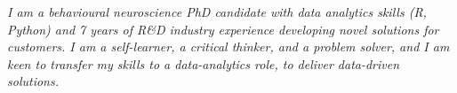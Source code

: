 
\textit{I am a behavioural neuroscience PhD candidate with data analytics skills (R, Python) and 7 years of R\&D industry experience developing novel solutions for customers.
I am a self-learner, a critical thinker, and a problem solver, and I am keen to transfer my skills to a data-analytics role, to deliver data-driven solutions.
}
